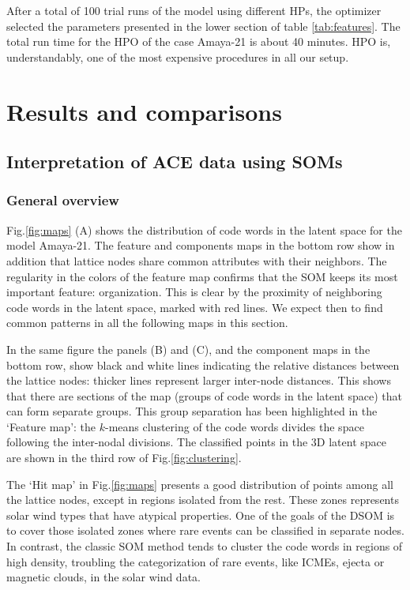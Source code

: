 \documentclass[utf8]{frontiersSCNS} %
\begin{document}
After a total of 100 trial runs of the model using different HPs, the optimizer selected the parameters presented in the lower section of table \ref{tab:features}. The total run time for the HPO of the case Amaya-21 is about 40 minutes. HPO is, understandably, one of the most expensive procedures in all our setup.

\section{Results and comparisons}
\label{sec:results}
\subsection{Interpretation of ACE data using SOMs}

\subsubsection{General overview}

Fig.\ref{fig:maps} (A) shows the distribution of code words in the latent space for the model Amaya-21. The feature and components maps in the bottom row show in addition that lattice nodes share common attributes with their neighbors. The regularity in the colors of the feature map confirms that the SOM keeps its most important feature: organization. This is clear by the proximity of neighboring code words in the latent space, marked with red lines. We expect then to find common patterns in all the following maps in this section.

In the same figure the panels (B) and (C), and the component maps in the bottom row, show black and white lines indicating the relative distances between the lattice nodes: thicker lines represent larger inter-node distances. This shows that there are sections of the map (groups of code words in the latent space) that can form separate groups. This group separation has been highlighted in the `Feature map': the $k$-means clustering of the code words divides the space following the inter-nodal divisions. The classified points in the 3D latent space are shown in the third row of Fig.\ref{fig:clustering}.

The `Hit map' in Fig.\ref{fig:maps} presents a good distribution of points among all the lattice nodes, except in regions isolated from the rest. These zones represents solar wind types that have atypical properties. One of the goals of the DSOM is to cover those isolated zones where rare events can be classified in separate nodes. In contrast, the classic SOM method tends to cluster the code words in regions of high density, troubling the categorization of rare events, like ICMEs, ejecta or magnetic clouds, in the solar wind data.
\end{document}
